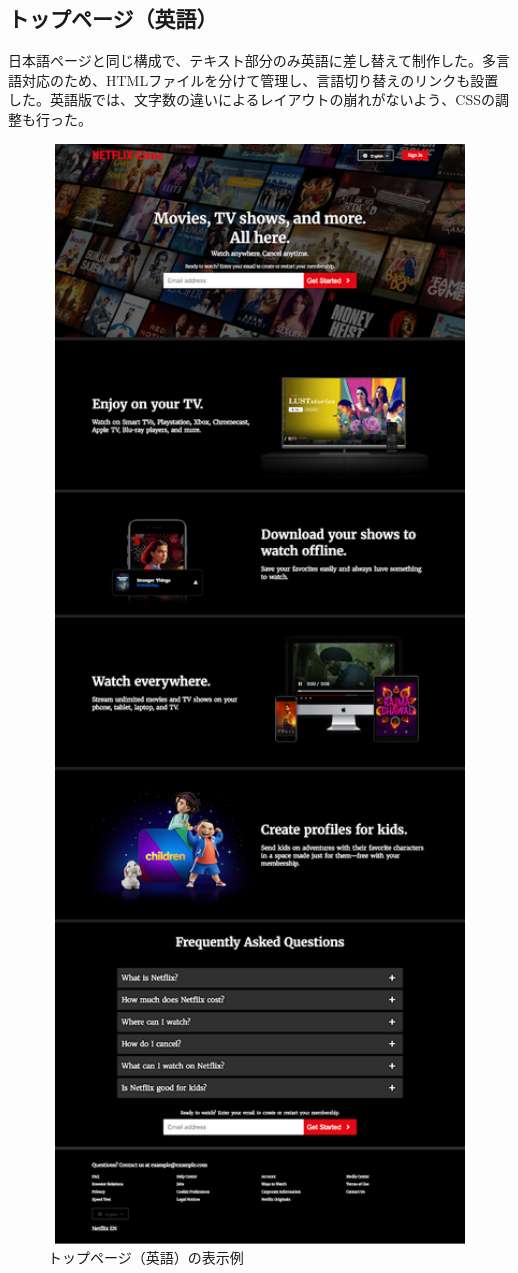 \documentclass[12pt,a4j]{jarticle}
\begin{document}
\subsection{トップページ（英語）}
日本語ページと同じ構成で、テキスト部分のみ英語に差し替えて制作した。多言語対応のため、HTMLファイルを分けて管理し、言語切り替えのリンクも設置した。英語版では、文字数の違いによるレイアウトの崩れがないよう、CSSの調整も行った。

\begin{figure}[htbp]
\begin{center}
\includegraphics[width=12cm]{top_en.png}
\caption{トップページ（英語）の表示例}\label{fig2}
\end{center}
\end{figure}
\end{document}
